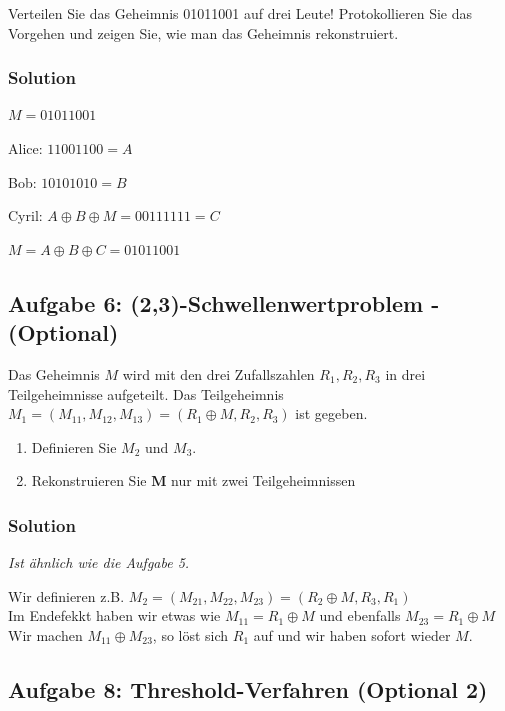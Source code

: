 \documentclass[11pt]{article}
\providecommand{\tightlist}{%
      \setlength{\itemsep}{0pt}\setlength{\parskip}{0pt}}
\begin{document}
Verteilen Sie das Geheimnis 01011001 auf drei Leute! Protokollieren Sie
das Vorgehen und zeigen Sie, wie man das Geheimnis rekonstruiert.

\hypertarget{solution}{%
\subsubsection{Solution}\label{solution}}

\(M = 01011001\)

Alice: \(11001100 = A\)

Bob: \(10101010 = B\)

Cyril: \(A \oplus B \oplus M = 00111111 = C\)

\(M = A \oplus B \oplus C = 01011001\)

    \hypertarget{aufgabe-6-23-schwellenwertproblem---optional}{%
\subsection{Aufgabe 6: (2,3)-Schwellenwertproblem -
(Optional)}\label{aufgabe-6-23-schwellenwertproblem---optional}}

Das Geheimnis \(M\) wird mit den drei Zufallszahlen \(R_1, R_2, R_3\) in
drei Teilgeheimnisse aufgeteilt. Das Teilgeheimnis
\(M_1=(M_{11},M_{12},M_{13})=(R_1 \oplus M, R_2,R_3)\) ist gegeben.

\begin{enumerate}
\def\labelenumi{\arabic{enumi}.}
\tightlist
\item
  Definieren Sie \(M_2\) und \(M_3\).\\
\item
  Rekonstruieren Sie \textbf{M} nur mit zwei Teilgeheimnissen
\end{enumerate}

\hypertarget{solution}{%
\subsubsection{Solution}\label{solution}}

\emph{Ist ähnlich wie die Aufgabe 5.}

Wir definieren z.B.
\(M_2=(M_{21},M_{22},M_{23})=(R_2 \oplus M, R_3,R_1)\)\\
Im Endefekkt haben wir etwas wie \(M_{11} = R_1 \oplus M\) und ebenfalls
\(M_{23} = R_1 \oplus M\)\\
Wir machen \(M_{11} \oplus M_{23}\), so löst sich \(R_1\) auf und wir
haben sofort wieder \(M\).

    \hypertarget{aufgabe-8-threshold-verfahren-optional-2}{%
\subsection{Aufgabe 8: Threshold-Verfahren (Optional
2)}\label{aufgabe-8-threshold-verfahren-optional-2}}
\end{document}
